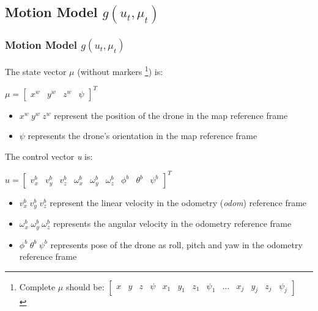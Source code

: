 \documentclass{beamer}
\begin{document}
    \subsection{Motion Model $g \left( u_t , \mu_{t}  \right)$ }
    \begin{frame}
        \justifying
        \frametitle{Motion Model $g \left( u_t , \mu_{t}  \right)$}
        The state vector $\mu$ (without markers \footnote{\tiny{Complete $\mu$ should be: $\begin{bmatrix} x & y & z & \psi & x_{1} & y_{1} & z_{1} & \psi_{1} & \dots & x_{j} & y_{j} & z_{j} & \psi_{j}\end{bmatrix}$\\ %
        }}) is: \\
        \begin{block}{}
            \centering
            $\mu = \begin{bmatrix} x^w & y^w & z^w & \psi \end{bmatrix}^T$
        \end{block}
        \begin{itemize}
            \item{$x^w \hspace{3pt} y^w \hspace{3pt} z^w $ represent the position of the drone in the map reference frame}
            \item{$\psi $ represents the drone's orientation in the map reference frame}
        \end{itemize}

    \end{frame}

    \begin{frame}
        \justifying

        The control vector \textit{u} is: \\
        \begin{block}{}
            \centering
            $u = \begin{bmatrix} v_x^b & v_y^b & v_z^b & \omega_x^b & \omega_y^b & \omega_z^b & \phi^b & \theta^b & \psi^b \end{bmatrix}^T$
        \end{block}
        \begin{itemize}
            \item{$v_x^b \hspace{3pt} v_y^b \hspace{3pt} v_z^b $ represent the linear velocity in the odometry (\textit{odom}) reference frame}
            \item{$\omega_x^b \hspace{3pt} \omega_y^b \hspace{3pt} \omega_z^b $ represents the angular velocity in the odometry reference frame}
            \item{$\phi^b \hspace{3pt} \theta^b \hspace{3pt} \psi^b $ represents pose of the drone as roll, pitch and yaw in the odometry reference frame}
        \end{itemize}

    \end{frame}
\end{document}
